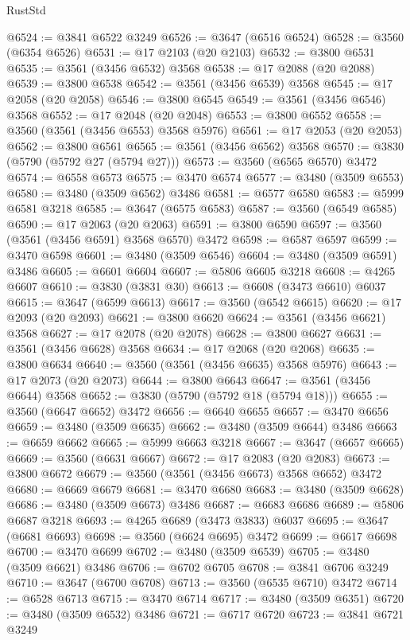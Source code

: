 \begin{lexlean}{RustStd}
\begin{coremodule}
@6524 := @3841 @6522 @3249
@6526 := @3647 (@6516 @6524)
@6528 := @3560 (@6354 @6526)
@6531 := @17 @2103 (@20 @2103)
@6532 := @3800 @6531
@6535 := @3561 (@3456 @6532) @3568
@6538 := @17 @2088 (@20 @2088)
@6539 := @3800 @6538
@6542 := @3561 (@3456 @6539) @3568
@6545 := @17 @2058 (@20 @2058)
@6546 := @3800 @6545
@6549 := @3561 (@3456 @6546) @3568
@6552 := @17 @2048 (@20 @2048)
@6553 := @3800 @6552
@6558 := @3560 (@3561 (@3456 @6553) @3568 @5976)
@6561 := @17 @2053 (@20 @2053)
@6562 := @3800 @6561
@6565 := @3561 (@3456 @6562) @3568
@6570 := @3830 (@5790 (@5792 @27 (@5794 @27)))
@6573 := @3560 (@6565 @6570) @3472
@6574 := @6558 @6573
@6575 := @3470 @6574
@6577 := @3480 (@3509 @6553)
@6580 := @3480 (@3509 @6562) @3486
@6581 := @6577 @6580
@6583 := @5999 @6581 @3218
@6585 := @3647 (@6575 @6583)
@6587 := @3560 (@6549 @6585)
@6590 := @17 @2063 (@20 @2063)
@6591 := @3800 @6590
@6597 := @3560 (@3561 (@3456 @6591) @3568 @6570) @3472
@6598 := @6587 @6597
@6599 := @3470 @6598
@6601 := @3480 (@3509 @6546)
@6604 := @3480 (@3509 @6591) @3486
@6605 := @6601 @6604
@6607 := @5806 @6605 @3218
@6608 := @4265 @6607
@6610 := @3830 (@3831 @30)
@6613 := @6608 (@3473 @6610) @6037
@6615 := @3647 (@6599 @6613)
@6617 := @3560 (@6542 @6615)
@6620 := @17 @2093 (@20 @2093)
@6621 := @3800 @6620
@6624 := @3561 (@3456 @6621) @3568
@6627 := @17 @2078 (@20 @2078)
@6628 := @3800 @6627
@6631 := @3561 (@3456 @6628) @3568
@6634 := @17 @2068 (@20 @2068)
@6635 := @3800 @6634
@6640 := @3560 (@3561 (@3456 @6635) @3568 @5976)
@6643 := @17 @2073 (@20 @2073)
@6644 := @3800 @6643
@6647 := @3561 (@3456 @6644) @3568
@6652 := @3830 (@5790 (@5792 @18 (@5794 @18)))
@6655 := @3560 (@6647 @6652) @3472
@6656 := @6640 @6655
@6657 := @3470 @6656
@6659 := @3480 (@3509 @6635)
@6662 := @3480 (@3509 @6644) @3486
@6663 := @6659 @6662
@6665 := @5999 @6663 @3218
@6667 := @3647 (@6657 @6665)
@6669 := @3560 (@6631 @6667)
@6672 := @17 @2083 (@20 @2083)
@6673 := @3800 @6672
@6679 := @3560 (@3561 (@3456 @6673) @3568 @6652) @3472
@6680 := @6669 @6679
@6681 := @3470 @6680
@6683 := @3480 (@3509 @6628)
@6686 := @3480 (@3509 @6673) @3486
@6687 := @6683 @6686
@6689 := @5806 @6687 @3218
@6693 := @4265 @6689 (@3473 @3833) @6037
@6695 := @3647 (@6681 @6693)
@6698 := @3560 (@6624 @6695) @3472
@6699 := @6617 @6698
@6700 := @3470 @6699
@6702 := @3480 (@3509 @6539)
@6705 := @3480 (@3509 @6621) @3486
@6706 := @6702 @6705
@6708 := @3841 @6706 @3249
@6710 := @3647 (@6700 @6708)
@6713 := @3560 (@6535 @6710) @3472
@6714 := @6528 @6713
@6715 := @3470 @6714
@6717 := @3480 (@3509 @6351)
@6720 := @3480 (@3509 @6532) @3486
@6721 := @6717 @6720
@6723 := @3841 @6721 @3249

\end{coremodule}
\end{lexlean}
